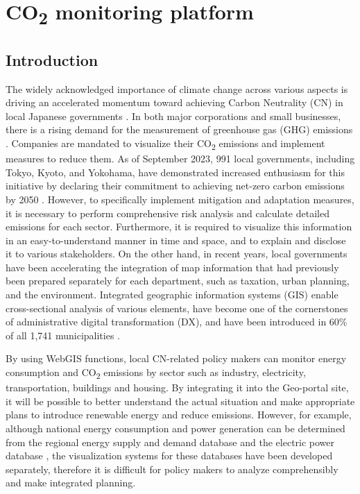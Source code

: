 \chapter{CO\textsubscript{2} monitoring platform} \label{chap7}
\renewcommand{\headrulewidth}{0pt}
\lhead[\thepage]{\leftmark}
\rhead[\leftmark]{\thepage}
\cfoot[]{}

\section{Introduction}

The widely acknowledged importance of climate change across various aspects \citep{primack2009impact, watanabe2009general, ogawa2013ecological, shibuya2016effect} is driving an accelerated momentum toward achieving Carbon Neutrality (CN) in local Japanese governments \citep{nakazawa2023net}. In both major corporations and small businesses, there is a rising demand for the measurement of greenhouse gas (GHG) emissions \citep{kauffmann2012corporate}. Companies are mandated to visualize their CO\textsubscript{2} emissions and implement measures to reduce them. As of September 2023, 991 local governments, including Tokyo, Kyoto, and Yokohama, have demonstrated increased enthusiasm for this initiative by declaring their commitment to achieving net-zero carbon emissions by 2050 \citep{zerocarboncities}. However, to specifically implement mitigation and adaptation measures, it is necessary to perform comprehensive risk analysis and calculate detailed emissions for each sector. Furthermore, it is required to visualize this information in an easy-to-understand manner in time and space, and to explain and disclose it to various stakeholders. On the other hand, in recent years, local governments have been accelerating the integration of map information that had previously been prepared separately for each department, such as taxation, urban planning, and the environment. Integrated geographic information systems (GIS) enable cross-sectional analysis of various elements, have become one of the cornerstones of administrative digital transformation (DX), and have been introduced in 60\% of all 1,741 municipalities \citep{nikkei}.\par

By using WebGIS functions, local CN-related policy makers can monitor energy consumption and CO\textsubscript{2} emissions by sector such as industry, electricity, transportation, buildings and housing. By integrating it into the Geo-portal site, it will be possible to better understand the actual situation and make appropriate plans to introduce renewable energy and reduce emissions. However, for example, although national energy consumption and power generation can be determined from the regional energy supply and demand database \citep{Toshihiko} and the electric power database \citep{kitamoto, nlftp}, the visualization systems for these databases have been developed separately, therefore it is difficult for policy makers to analyze comprehensibly and make integrated planning.\par

